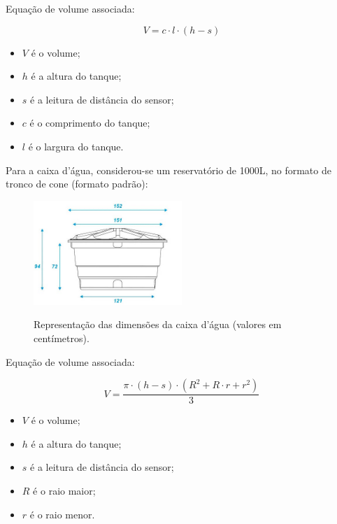 Equação de volume associada:

\begin{equation}
V = c \cdot l \cdot (h-s)  
\end{equation}

\begin{itemize}
	\item $V$ é o volume;
	\item $h$ é a altura do tanque;
	\item $s$ é a leitura de distância do sensor;
	\item $c$ é o comprimento do tanque;
	\item $l$ é o largura do tanque. \\
\end{itemize}

Para a caixa d'água, considerou-se um reservatório de 1000L, no formato de tronco de cone (formato padrão):

\begin{figure}[H]
	\centering
	\caption{Representação das dimensões da caixa d'água (valores em centímetros).}
	\includegraphics[width=0.5\textwidth]{figuras/caixa.jpg}
	\label{fig:volume_tanque}
\end{figure}

Equação de volume associada:

\begin{equation}
V = \frac{\pi\cdot (h-s)\cdot (R^{2}+R\cdot r+r^{2})}{3} 
\end{equation}

\begin{itemize}
	\item $V$ é o volume;
	\item $h$ é a altura do tanque;
	\item $s$ é a leitura de distância do sensor;
	\item $R$ é o raio maior;
	\item $r$ é o raio menor.
\end{itemize}




